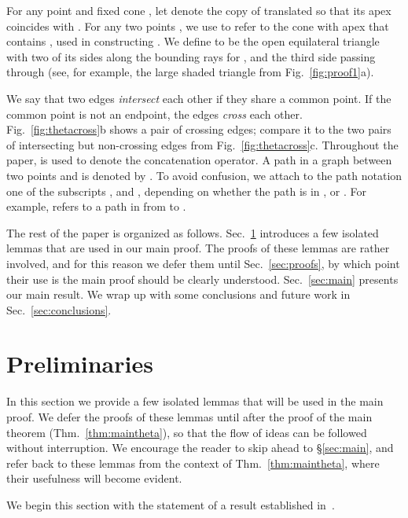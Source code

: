 \documentclass[11pt]{article}
\begin{document}
For any point  and fixed cone , let  denote the copy of  translated so that its apex coincides with .
For any two points , we use  to refer to the cone with apex  that contains , used in constructing .
We define  to be the open equilateral triangle with two of its sides along the
bounding rays for , and the third side passing through  (see, for example, the large shaded
triangle from Fig.~\ref{fig:proof1}a).

We say that two edges \emph{intersect} each other if they share a common point. If the common point is not an endpoint, the edges \emph{cross} each other. Fig.~\ref{fig:thetacross}b shows a pair of crossing edges; compare it to the two pairs of intersecting but non-crossing edges from Fig.~\ref{fig:thetacross}c. Throughout the paper,  is used to denote the
concatenation operator. A path in a graph between two points  and  is denoted by . To avoid confusion, we attach to the path notation one of the subscripts ,  and , depending on whether the path is in ,  or . For example,  refers to a path in  from  to .

The rest of the paper is organized as follows. Sec.~\ref{sec:basic} introduces a few isolated lemmas that are used in our main proof. The proofs of these lemmas are rather involved, and for this reason we defer them until Sec.~\ref{sec:proofs}, by which point their use is the main proof should be clearly understood. Sec.~\ref{sec:main} presents our main result. We wrap up with some conclusions and future work in Sec.~\ref{sec:conclusions}.

\section{Preliminaries}
\label{sec:basic}
In this section we provide a few isolated lemmas that will be used in the main proof. We defer the proofs of these lemmas until after the proof of the main theorem (Thm.~\ref{thm:maintheta}), so that the flow of ideas can be followed without interruption. We encourage the reader to skip ahead to \S\ref{sec:main}, and refer back to these lemmas from the context of Thm.~\ref{thm:maintheta}, where their usefulness will become evident.

\medskip
\noindent
We begin this section with the statement of a result established in~\cite{Bon+10}.
\end{document}
